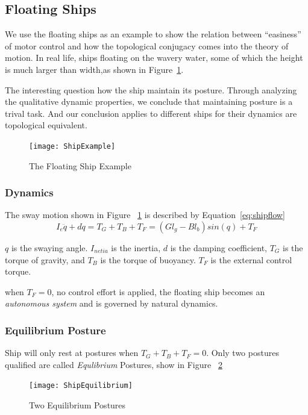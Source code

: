 \subsection{Floating Ships}
We use the floating ships as an example to show the relation between ``easiness'' of motor control and how the topological conjugacy comes into the theory of motion.
In real life, ships floating on the wavery water, some of which the height is much larger than width,as shown in Figure~\ref{fig:ShipFloating}.

The interesting question how the ship maintain its posture.
Through analyzing the qualitative dynamic properties, we conclude that maintaining posture is a trival task.
And our conclusion applies to different ships for their dynamics are topological equivalent.


\begin{figure}[!htbp]
  \begin{center}
    \texttt{[image: ShipExample]}
    \caption{The Floating Ship Example}
    \label{fig:ShipFloating}
  \end{center}
\end{figure}

\subsubsection*{Dynamics}
The sway motion shown in Figure ~\ref{fig:ShipFloating} is described by Equation~\ref{eq:shipflow}
\begin{equation}
\label{eq:shipflow}
I_{e}\ddot{q}+d\dot{q}=T_{G}+T_{B}+T_{F}=(Gl_{g}-Bl_{b})sin(q)+T_{F}
\end{equation}

$q$ is the swaying angle.
$I_{netia}$ is the inertia,  
$d$ is the damping coefficient,
$T_{G}$ is the torque of gravity, and $T_{B}$ is the torque of buoyancy.
$T_{F}$ is the external control torque.

when $T_{F}=0$, no control effort is applied, the floating ship becomes an \emph{autonomous system} and is governed by natural dynamics.





\subsubsection*{Equilibrium Posture}
Ship will only rest at postures when $T_{G}+T_{B}+T_{F}=0$.
Only two postures qualified are called \emph{Equlibrium} Postures, show in Figure ~\ref{fig:ShipEqulibrium}
\begin{figure}[!htbp]
  \begin{center}
      \texttt{[image: ShipEquilibrium]}
    \caption{Two Equilibrium Postures}
    \label{fig:ShipEqulibrium}
  \end{center}
\end{figure}




